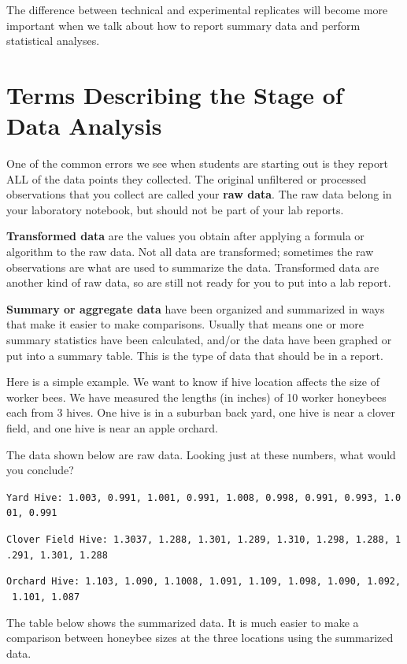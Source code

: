 \documentclass[
]{book}
\begin{document}
The difference between technical and experimental replicates will become more important when we talk about how to report summary data and perform statistical analyses.

\hypertarget{terms-describing-the-stage-of-data-analysis}{%
\section{Terms Describing the Stage of Data Analysis}\label{terms-describing-the-stage-of-data-analysis}}

One of the common errors we see when students are starting out is they report ALL of the data points they collected. The original unfiltered or processed observations that you collect are called your \textbf{raw data}. The raw data belong in your laboratory notebook, but should not be part of your lab reports.

\textbf{Transformed data} are the values you obtain after applying a formula or algorithm to the raw data. Not all data are transformed; sometimes the raw observations are what are used to summarize the data. Transformed data are another kind of raw data, so are still not ready for you to put into a lab report.

\textbf{Summary or aggregate data} have been organized and summarized in ways that make it easier to make comparisons. Usually that means one or more summary statistics have been calculated, and/or the data have been graphed or put into a summary table. This is the type of data that should be in a report.

Here is a simple example. We want to know if hive location affects the size of worker bees. We have measured the lengths (in inches) of 10 worker honeybees each from 3 hives. One hive is in a suburban back yard, one hive is near a clover field, and one hive is near an apple orchard.

The data shown below are raw data. Looking just at these numbers, what would you conclude?

\texttt{Yard\ Hive:\ 1.003,\ 0.991,\ 1.001,\ 0.991,\ 1.008,\ 0.998,\ 0.991,\ 0.993,\ 1.001,\ 0.991}

\texttt{Clover\ Field\ Hive:\ 1.3037,\ 1.288,\ 1.301,\ 1.289,\ 1.310,\ 1.298,\ 1.288,\ 1.291,\ 1.301,\ 1.288}

\texttt{Orchard\ Hive:\ 1.103,\ 1.090,\ 1.1008,\ 1.091,\ 1.109,\ 1.098,\ 1.090,\ 1.092,\ 1.101,\ 1.087}

The table below shows the summarized data. It is much easier to make a comparison between honeybee sizes at the three locations using the summarized data.
\end{document}
